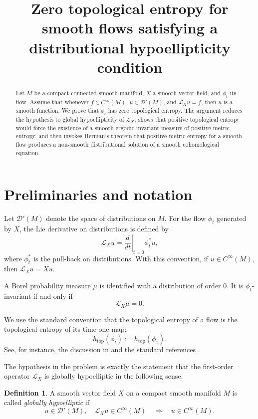 \documentclass[11pt]{article}
\title{Zero topological entropy for smooth flows satisfying a distributional hypoellipticity condition}
\author{}
\date{}
\theoremstyle{definition}
\newtheorem{definition}{Definition}
\theoremstyle{remark}
\numberwithin{equation}{section}
\begin{document}
\maketitle

\begin{abstract}
Let \(M\) be a compact connected smooth manifold, \(X\) a smooth vector field, and
\(\phi_t\) its flow. Assume that whenever \(f\in C^\infty(M)\), \(u\in\mathcal D'(M)\),
and \(\mathcal L_X u=f\), then \(u\) is a smooth function. We prove that
\(\phi_t\) has zero topological entropy. The argument reduces the hypothesis to
global hypoellipticity of \(\mathcal L_X\), shows that positive topological entropy
would force the existence of a smooth ergodic invariant measure of positive metric
entropy, and then invokes Herman's theorem that positive metric entropy for a smooth
flow produces a non-smooth distributional solution of a smooth cohomological equation.
\end{abstract}

\section{Preliminaries and notation}

Let \(\mathcal D'(M)\) denote the space of distributions on \(M\). For the flow
\(\phi_t\) generated by \(X\), the Lie derivative on distributions is defined by
\[
  \mathcal L_X u
  = \left.\frac{d}{dt}\right|_{t=0} \phi_t^*u,
\]
where \(\phi_t^*\) is the pull-back on distributions. With this convention,
if \(u\in C^\infty(M)\), then \(\mathcal L_Xu=Xu\).

A Borel probability measure \(\mu\) is identified with a distribution of order \(0\).
It is \(\phi_t\)-invariant if and only if
\[
  \mathcal L_X\mu=0.
\]

We use the standard convention that the topological entropy of a flow is the
topological entropy of its time-one map:
\[
  h_{\mathrm{top}}(\phi_t):=h_{\mathrm{top}}(\phi_1).
\]
See, for instance, the discussion in \cite{exa} and the standard references
\cite{walters,kh}.

The hypothesis in the problem is exactly the statement that the first-order
operator \(\mathcal L_X\) is globally hypoelliptic in the following sense.

\begin{definition}
A smooth vector field \(X\) on a compact smooth manifold \(M\) is called
\emph{globally hypoelliptic} if
\[
  u\in\mathcal D'(M),\quad \mathcal L_Xu\in C^\infty(M)
  \quad\Longrightarrow\quad
  u\in C^\infty(M).
\]
\end{definition}
\end{document}
